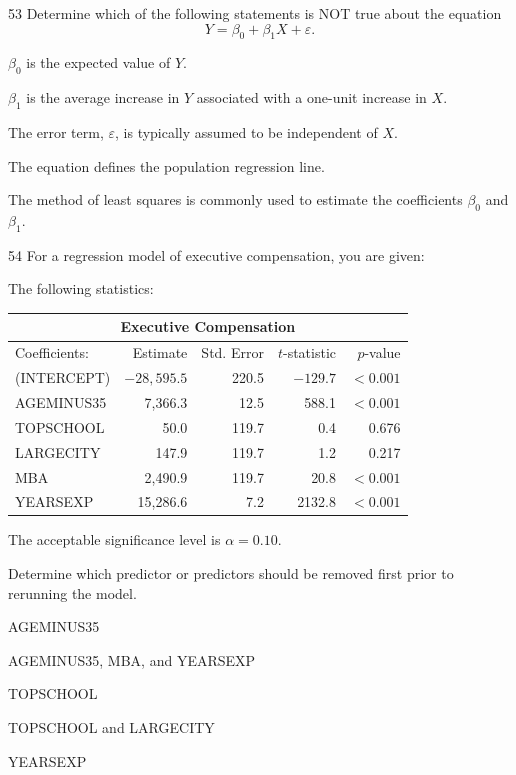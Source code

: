 \begin{question}{53}
Determine which of the following statements is NOT true about the equation
\[ Y = \beta_0 + \beta_1 X + \varepsilon. \]

\begin{choices}
\item $\beta_0$ is the expected value of $Y$.
\item $\beta_1$ is the average increase in $Y$ associated with a one-unit increase in $X$.
\item The error term, $\varepsilon$, is typically assumed to be independent of $X$.
\item The equation defines the population regression line.
\item The method of least squares is commonly used to estimate the coefficients $\beta_0$ and $\beta_1$.
\end{choices}
\end{question}

\begin{question}{54}
For a regression model of executive compensation, you are given:
\begin{given}
\item The following statistics:
\begin{center}
\begin{tabular}{|l|r|r|r|r|}
\hline
\multicolumn{5}{|c|}{Executive Compensation} \\ \hline
Coefficients: & Estimate & Std. Error & $t$-statistic & $p$-value \\ \hline
(INTERCEPT) & $-28{,}595.5$ & 220.5 & $-129.7$ & $<0.001$ \\ \hline
AGEMINUS35 & 7,366.3 & 12.5 & 588.1 & $<0.001$ \\ \hline
TOPSCHOOL & 50.0 & 119.7 & 0.4 & 0.676 \\ \hline
LARGECITY & 147.9 & 119.7 & 1.2 & 0.217 \\ \hline
MBA & 2,490.9 & 119.7 & 20.8 & $<0.001$ \\ \hline
YEARSEXP & 15,286.6 & 7.2 & 2132.8 & $<0.001$ \\ \hline
\end{tabular}
\end{center}
\item The acceptable significance level is $\alpha = 0.10$.
\end{given}

Determine which predictor or predictors should be removed first prior to rerunning the model.

\begin{choices}
\item AGEMINUS35
\item AGEMINUS35, MBA, and YEARSEXP
\item TOPSCHOOL
\item TOPSCHOOL and LARGECITY
\item YEARSEXP
\end{choices}
\end{question}

